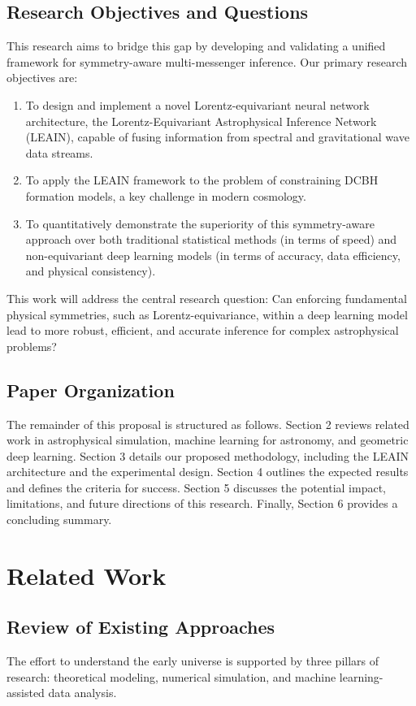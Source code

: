 \documentclass[11pt, a4paper]{article}
\begin{document}
\subsection{Research Objectives and Questions}
This research aims to bridge this gap by developing and validating a unified framework for symmetry-aware multi-messenger inference. Our primary research objectives are:
\begin{enumerate}
    \item To design and implement a novel Lorentz-equivariant neural network architecture, the Lorentz-Equivariant Astrophysical Inference Network (LEAIN), capable of fusing information from spectral and gravitational wave data streams.
    \item To apply the LEAIN framework to the problem of constraining DCBH formation models, a key challenge in modern cosmology.
    \item To quantitatively demonstrate the superiority of this symmetry-aware approach over both traditional statistical methods (in terms of speed) and non-equivariant deep learning models (in terms of accuracy, data efficiency, and physical consistency).
\end{enumerate}
This work will address the central research question: Can enforcing fundamental physical symmetries, such as Lorentz-equivariance, within a deep learning model lead to more robust, efficient, and accurate inference for complex astrophysical problems?

\subsection{Paper Organization}
The remainder of this proposal is structured as follows. Section 2 reviews related work in astrophysical simulation, machine learning for astronomy, and geometric deep learning. Section 3 details our proposed methodology, including the LEAIN architecture and the experimental design. Section 4 outlines the expected results and defines the criteria for success. Section 5 discusses the potential impact, limitations, and future directions of this research. Finally, Section 6 provides a concluding summary.

\section{Related Work}

\subsection{Review of Existing Approaches}
The effort to understand the early universe is supported by three pillars of research: theoretical modeling, numerical simulation, and machine learning-assisted data analysis.
\end{document}
